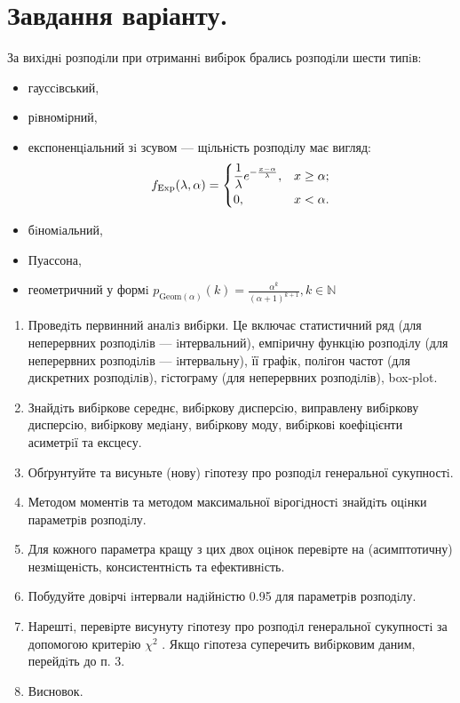 \documentclass[14pt,a4paper]{scrartcl}
\theoremstyle{definition}
\theoremstyle{remark}
\theoremstyle{definition}
\theoremstyle{definition}
\begin{document}
\section*{Завдання варіанту.}
За вихiднi розподiли при отриманнi вибiрок
брались розподiли шести типiв:
\begin{itemize}
	\item гауссiвський,
	\item рiвномiрний,
 	\item експоненцiальний зi зсувом — щiльнiсть розподiлу має вигляд:
	\[
	 f_{\mathrm{Exp}} (\lambda, \alpha) = \begin{dcases}
	  \frac{1}{\lambda} e^{- \frac{x- \alpha}{\lambda}} , & x\geq \alpha;\\
		0 , & x < \alpha.
	 \end{dcases}
	\]
	\item бiномiальний,
	\item Пуассона,
	\item геометричний у формi \( p_{
	\mathrm{Geom} (\alpha)
	} (k)  = \frac{\alpha^k}{(\alpha+1)^{k+1}}, k \in \mathbb{N} \)
\end{itemize}
\begin{enumerate}
	\item Проведiть первинний аналiз вибiрки. Це включає статистичний ряд (для неперервних розподiлiв — iнтервальний), емпiричну функцiю розподiлу (для неперервних розподiлiв — iнтервальну), її графiк, полiгон частот (для дискретних розподiлiв), гiстограму (для неперервних розподiлiв), box-plot.
	\item Знайдiть вибiркове середнє, вибiркову дисперсiю, виправлену вибiркову дисперсiю, вибiркову медiану, вибiркову моду, вибiрковi коефiцiєнти асиметрiї та ексцесу.
	\item Обґрунтуйте та висуньте (нову) гiпотезу про розподiл генеральної сукупностi.
	\item Методом моментiв та методом максимальної вiрогiдностi знайдiть оцiнки параметрiв розподiлу.
	\item  Для кожного параметра кращу з цих двох оцiнок перевiрте на (асимптотичну) незмiщенiсть,
консистентнiсть та ефективнiсть.
	\item Побудуйте довiрчi iнтервали надiйнiстю 0.95 для параметрiв розподiлу.
\item Нарештi, перевiрте висунуту гiпотезу про розподiл генеральної сукупностi за допомогою
критерiю \( \chi^2 \) . Якщо гiпотеза суперечить вибiрковим даним, перейдiть до п. 3.
\item Висновок.
\end{enumerate}
\end{document}
